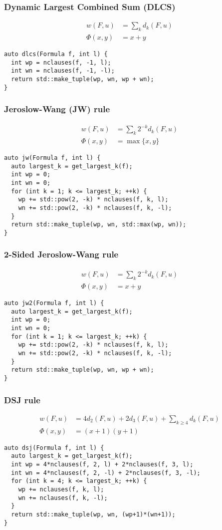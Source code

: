 \documentclass[10pt,AMS Euler]{article}
\begin{document}
\subsubsection*{Dynamic Largest Combined Sum (DLCS)}
\label{sec:org2bbeb17}
\begin{align*}
w(F,u) &= \sum_k d_k(F,u) \\
\Phi(x,y) &= x + y
\end{align*}
\begin{verbatim}
auto dlcs(Formula f, int l) {
  int wp = nclauses(f, -1, l);
  int wn = nclauses(f, -1, -l);
  return std::make_tuple(wp, wn, wp + wn);
}
\end{verbatim}
\subsubsection*{Jeroslow-Wang (JW) rule}
\label{sec:org2d1451e}
\begin{align*}
w(F,u) &= \sum_k 2^{-k} d_k(F,u) \\
\Phi(x,y) &= \max\{x,y\}
\end{align*}
\begin{verbatim}
auto jw(Formula f, int l) {
  auto largest_k = get_largest_k(f);
  int wp = 0;
  int wn = 0;
  for (int k = 1; k <= largest_k; ++k) {
    wp += std::pow(2, -k) * nclauses(f, k, l);
    wn += std::pow(2, -k) * nclauses(f, k, -l);
  }
  return std::make_tuple(wp, wn, std::max(wp, wn));
}
\end{verbatim}
\subsubsection*{2-Sided Jeroslow-Wang rule}
\label{sec:orgc32a676}
\begin{align*}
w(F,u) &= \sum_k 2^{-k} d_k(F,u) \\
\Phi(x,y) &= x + y
\end{align*}
\begin{verbatim}
auto jw2(Formula f, int l) {
  auto largest_k = get_largest_k(f);
  int wp = 0;
  int wn = 0;
  for (int k = 1; k <= largest_k; ++k) {
    wp += std::pow(2, -k) * nclauses(f, k, l);
    wn += std::pow(2, -k) * nclauses(f, k, -l);
  }
  return std::make_tuple(wp, wn, wp + wn);
}
\end{verbatim}
\subsubsection*{DSJ rule}
\label{sec:orgf40ee2b}
\begin{align*}
w(F,u) &= 4d_2(F,u) + 2d_3(F,u) + \sum_{k\geq 4} d_k(F,u) \\
\Phi(x,y) &= (x+1)(y+1)
\end{align*}
\begin{verbatim}
auto dsj(Formula f, int l) {
  auto largest_k = get_largest_k(f);
  int wp = 4*nclauses(f, 2, l) + 2*nclauses(f, 3, l);
  int wn = 4*nclauses(f, 2, -l) + 2*nclauses(f, 3, -l);
  for (int k = 4; k <= largest_k; ++k) {
    wp += nclauses(f, k, l);
    wn += nclauses(f, k, -l);
  }
  return std::make_tuple(wp, wn, (wp+1)*(wn+1));
}
\end{verbatim}
\end{document}
